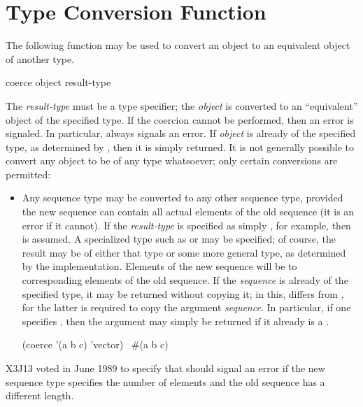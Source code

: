 \section{Type Conversion Function}

The following function may be used to convert an object to an
equivalent object of another type.

\begin{defun}[Function]
coerce object result-type

The \emph{result-type} must be a type specifier; the \emph{object} is converted
to an ``equivalent'' object of the specified type.
If the coercion cannot be performed, then an error is signaled.
In particular,  always signals an error.
If \emph{object} is already of the specified type, as determined
by , then it is simply returned.
It is not generally
possible to convert any object to be of any type whatsoever; only certain
conversions are permitted:
\begin{itemize}
\item
Any sequence type may be converted to any other sequence type, provided
the new sequence can contain all actual elements of the old sequence
(it is an error if it cannot).  If the \emph{result-type} is specified as
simply , for example, then  is assumed.  A
specialized type such as  or 
may be specified; of course, the result may be of either that type or
some more general type, as determined by the implementation.
Elements of the new sequence will be  to corresponding elements
of the old sequence.
If the
\emph{sequence} is already of the specified type, it may be returned without
copying it; in this,  differs from
, for the latter is required to
copy the argument \emph{sequence}.  In particular, if one specifies
, then the argument may simply be returned if it already is
a .
\begin{lisp}
(coerce '(a b c) 'vector) \EV\ \#(a b c)
\end{lisp}

\end{itemize}

\begin{newer}
X3J13 voted in June 1989  to specify that
 should signal an error if the new sequence type specifies the
number of elements and the old sequence has a different length.
\end{newer}


\end{defun}
